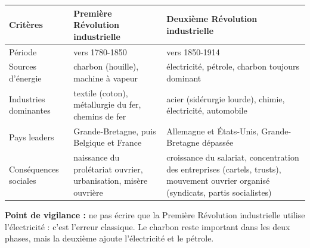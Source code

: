 \documentclass[11pt]{article}
\begin{document}
\begin{corrige}
\begin{center}
\begin{tabularx}{\linewidth}{|l|X|X|}\hline
\rowcolor{popblueL} Critères & Première Révolution industrielle & Deuxième Révolution industrielle \\ \hline
Période & vers 1780-1850 & vers 1850-1914 \\ \hline
Sources d'énergie & charbon (houille), machine à vapeur & électricité, pétrole, charbon toujours dominant \\ \hline
Industries dominantes & textile (coton), métallurgie du fer, chemins de fer & acier (sidérurgie lourde), chimie, électricité, automobile \\ \hline
Pays leaders & Grande-Bretagne, puis Belgique et France & Allemagne et États-Unis, Grande-Bretagne dépassée \\ \hline
Conséquences sociales & naissance du prolétariat ouvrier, urbanisation, misère ouvrière & croissance du salariat, concentration des entreprises (cartels, trusts), mouvement ouvrier organisé (syndicats, partis socialistes) \\ \hline
\end{tabularx}
\end{center}
\textbf{Point de vigilance :} ne pas écrire que la Première Révolution industrielle utilise l'électricité : c'est l'erreur classique. Le charbon reste important dans les deux phases, mais la deuxième ajoute l'électricité et le pétrole.
\end{corrige}
\end{document}
